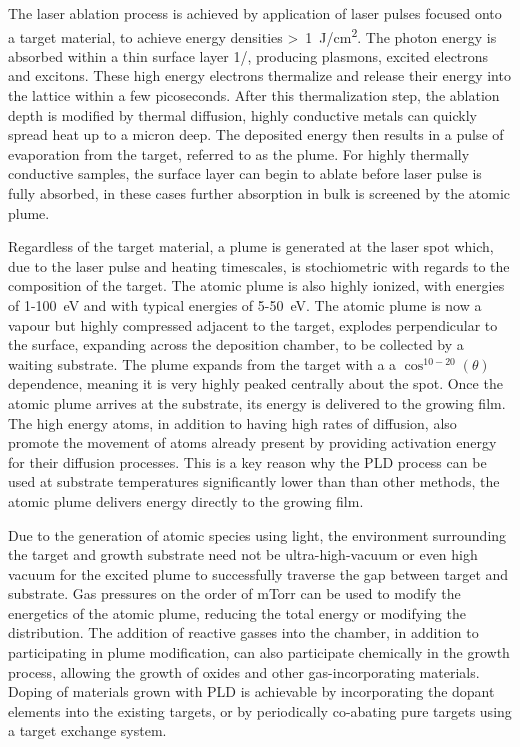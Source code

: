 The laser ablation process is achieved by application of laser pulses focused onto a target material, to achieve energy densities >~1~J/cm\textsuperscript{2}.
The photon energy is absorbed within a thin surface layer 1/\textalpha{}, producing plasmons, excited electrons and excitons\cite{Willmott2000}.
These high energy electrons thermalize and release their energy into the lattice within a few picoseconds.
After this thermalization step, the ablation depth is modified by thermal diffusion, highly conductive metals can quickly spread heat up to a micron deep.
The deposited energy then results in a pulse of evaporation from the target, referred to as the plume.
For highly thermally conductive samples, the surface layer can begin to ablate before laser pulse is fully absorbed, in these cases further absorption in bulk is screened by the atomic plume\cite{Willmott2000}.

Regardless of the target material, a plume is generated at the laser spot which, due to the laser pulse and heating timescales, is stochiometric with regards to the composition of the target.
The atomic plume is also highly ionized, with energies of 1-100~eV and with typical energies of 5-50~eV. The atomic plume is now a vapour but highly compressed adjacent to the target, explodes perpendicular to the surface, expanding across the deposition chamber, to be collected by a waiting substrate.
The plume expands from the target with a a \(\cos^{10-20}(\theta)\)
dependence, meaning it is very highly peaked centrally about the spot.
Once the atomic plume arrives at the substrate, its energy is delivered to the growing film.
The high energy atoms, in addition to having high rates of diffusion, also promote the movement of atoms already present by providing activation energy for their diffusion processes\cite{Willmott2000}.
This is a key reason why the PLD process can be used at substrate temperatures significantly lower than than other methods, the atomic plume delivers energy directly to the growing film.

Due to the generation of atomic species using light, the environment surrounding the target and growth substrate need not be ultra-high-vacuum or even high vacuum for the excited plume to successfully traverse the gap between target and substrate.
Gas pressures on the order of mTorr can be used to modify the energetics of the atomic plume, reducing the total energy or modifying the distribution\cite{Willmott2000}.
The addition of reactive gasses into the chamber, in addition to participating in plume modification, can also participate chemically in the growth process, allowing the growth of oxides and other gas-incorporating materials.
Doping of materials grown with PLD is achievable by incorporating the dopant elements into the existing targets, or by periodically co-abating pure targets using a target exchange system.

